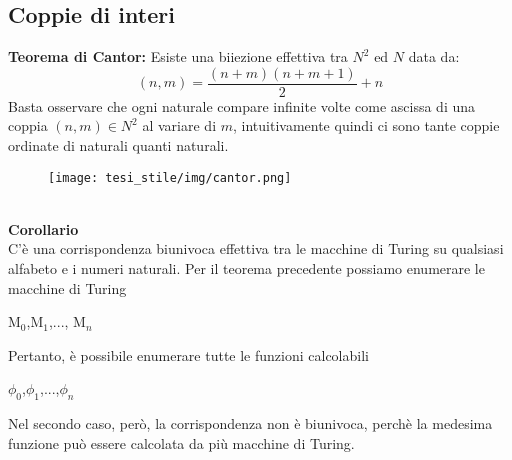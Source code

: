 \subsection{Coppie di interi}
\textbf{Teorema di Cantor:} Esiste una biiezione effettiva tra $N^2$ ed $N$ data da:\\
$$(n,m)=\frac{(n+m)(n+m+1)}{2}+n$$
Basta osservare che ogni naturale compare infinite volte come ascissa di una coppia $(n,m) \in N^2$ al variare di $m$, intuitivamente quindi ci sono tante coppie ordinate di naturali quanti naturali.
\begin{figure}[htp]
    \centering
    \texttt{[image: tesi\_stile/img/cantor.png]}
\end{figure}\\
\textbf{Corollario}\\
C’è una corrispondenza biunivoca effettiva tra le macchine di Turing su qualsiasi alfabeto e i numeri naturali.
Per il teorema precedente possiamo enumerare le macchine di Turing
\begin{center}
    M$_0$,M$_1$,...,    M$_n$
\end{center}
Pertanto, è possibile enumerare tutte le funzioni calcolabili
\begin{center}
    $\phi_0$,$\phi_1$,...,$\phi_n$
\end{center}
Nel secondo caso, però, la corrispondenza non è biunivoca, perchè la medesima funzione può essere calcolata da più macchine di Turing.
